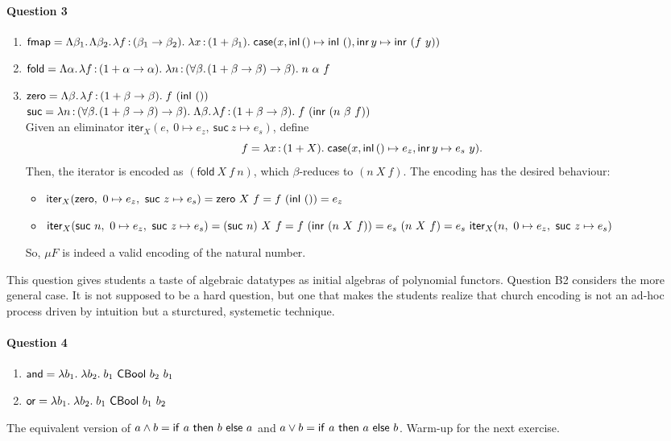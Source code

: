 \documentclass[11pt,a4paper,twoside]{article}
\begin{document}
\paragraph*{Question 3}
\begin{enumerate}[label=(\alph*)]
  \item $\mathsf{fmap} = 
    \Lam{\beta_1}{\Lam{\beta_2}{
      \lam{f}{(\beta_1 \to \beta_2)}{
        \lam{x}{(1+\beta_1)}{
          \case{x}{()}{y}{\inl\ ()}{\inr\ (f\ y)}
        }}}}$
  \item $\mathsf{fold} = 
    \Lam{\alpha}{
      \lam{f}{(1 + \alpha \to \alpha)}{
        \lam{n}{(\fora{\beta}{(1+\beta \to \beta) \to \beta})}{
          n\ \alpha\ f
        }}}$
  \item $\mathsf{zero} = 
    \Lam{\beta}{
      \lam{f}{(1+\beta \to \beta)}{f\ (\inl\ ())}
    }$\\
    $\mathsf{suc} = 
    \lam{n}{(\fora{\beta}{(1+\beta \to \beta) \to \beta})}
      {\Lam{\beta}{
        \lam{f}{(1+\beta \to \beta)}{f\ (\inr\ (n\ \beta\ f))}
      }}$\\
    Given an eliminator $\mathsf{iter}_X(e,\ 0 \mapsto e_z,\ \mathsf{suc}\ z \mapsto e_s)$,
    define 
      \[f = \lam{x}{(1 + X)}{\case{x}{()}{y}{e_z}{e_s\ y}}.\]
    Then, the iterator is encoded as $(\mathsf{fold}\ X\ f\ n)$, which $\beta$-reduces to
    $(n\ X\ f)$. The encoding has the desired behaviour:
    \begin{itemize}
      \item $\mathsf{iter}_X(\mathsf{zero},\ 0 \mapsto e_z,\ \mathsf{suc}\ z \mapsto e_s)
        = \mathsf{zero}\ X\ f = f\ (\inl\ ()) = e_z$
      \item $\mathsf{iter}_X(\mathsf{suc}\ n,\ 0 \mapsto e_z,\ \mathsf{suc}\ z \mapsto e_s)
        = (\mathsf{suc}\ n)\ X\ f = f\ (\inr\ (n\ X\ f)) = e_s\ (n\ X\ f)
        = e_s\ \mathsf{iter}_X(n,\ 0 \mapsto e_z,\ \mathsf{suc}\ z \mapsto e_s)$
    \end{itemize}
    So, $\mu F$ is indeed a valid encoding of the natural number.

\end{enumerate}
%
This question gives students a taste of algebraic datatypes as initial algebras
of polynomial functors. Question B2 considers the more general case. It is not supposed
to be a hard question, but one that makes the students realize that church encoding
is not an ad-hoc process driven by intuition but a sturctured, systemetic technique.

\paragraph*{Question 4}
\begin{enumerate}[label=(\alph*)]
  \item $\mathsf{and} = \ulam{b_1}{\ulam{b_2}{b_1\ \mathsf{CBool}\ b_2\ b_1}}$
  \item $\mathsf{or} = \ulam{b_1}{\ulam{b_2}{b_1\ \mathsf{CBool}\ b_1\ b_2}}$
\end{enumerate}
%
The equivalent version of $a \land b = \ifthen{a}{b}{a}$ and 
$a \lor b = \ifthen{a}{a}{b}$. Warm-up for the next exercise.
\end{document}
